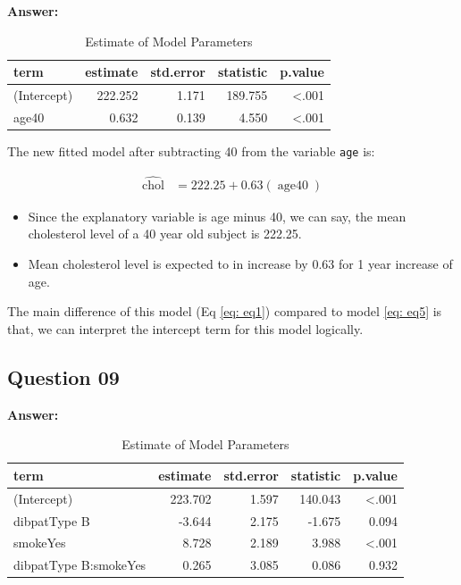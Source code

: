 \documentclass[
  12pt,
  oneside]{article}
\providecommand{\tightlist}{%
  \setlength{\itemsep}{0pt}\setlength{\parskip}{0pt}}
\begin{document}
\textbf{Answer:}

\begin{table}[H]

\caption{\label{tab:Table-10}Estimate of Model Parameters}
\centering
\begin{tabular}[t]{lrrrr}
\toprule
term & estimate & std.error & statistic & p.value\\
\midrule
(Intercept) & 222.252 & 1.171 & 189.755 & <.001\\
age40 & 0.632 & 0.139 & 4.550 & <.001\\
\bottomrule
\end{tabular}
\end{table}

The new fitted model after subtracting 40 from the variable \texttt{age} is:

\begin{equation}
\label{eq: eq5}
\begin{aligned}
\operatorname{\widehat{chol}} &= 222.25 + 0.63(\operatorname{age40})
\end{aligned}
\end{equation}

\begin{itemize}
\tightlist
\item
  Since the explanatory variable is age minus 40, we can say, the mean cholesterol level of a 40 year old subject is 222.25.
\item
  Mean cholesterol level is expected to in increase by 0.63 for 1 year increase of age.
\end{itemize}

The main difference of this model (Eq \ref{eq: eq1}) compared to model \ref{eq: eq5} is that, we can interpret the intercept term for this model logically.

\hypertarget{question-09}{%
\subsection{Question 09}\label{question-09}}

\textbf{Answer:}

\begin{table}[H]

\caption{\label{tab:Table-11}Estimate of Model Parameters}
\centering
\begin{tabular}[t]{lrrrr}
\toprule
term & estimate & std.error & statistic & p.value\\
\midrule
(Intercept) & 223.702 & 1.597 & 140.043 & <.001\\
dibpatType B & -3.644 & 2.175 & -1.675 & 0.094\\
smokeYes & 8.728 & 2.189 & 3.988 & <.001\\
dibpatType B:smokeYes & 0.265 & 3.085 & 0.086 & 0.932\\
\bottomrule
\end{tabular}
\end{table}
\end{document}
